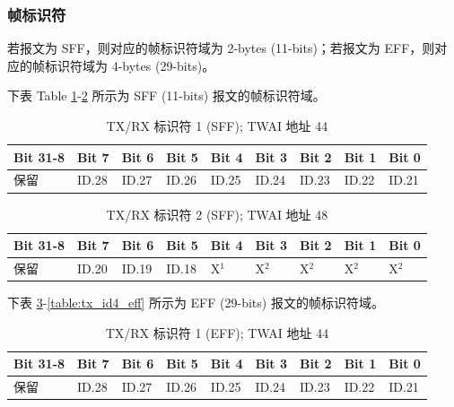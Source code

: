 \documentclass[main\_\_CN.tex]{subfiles}
\begin{document}
\subsubsection{帧标识符}
若报文为 SFF，则对应的帧标识符域为 2-bytes (11-bits)；若报文为 EFF，则对应的帧标识符域为 4-bytes (29-bits)。

下表 Table \ref{table:tx_id1_sff}-\ref{table:tx_id2_sff} 所示为 SFF (11-bits) 报文的帧标识符域。

\begin{longtable}[c]{|p{1.4cm}|p{1.4cm}|p{1.4cm}|p{1.4cm}|p{1.4cm}|p{1.4cm}|p{1.4cm}|p{1.4cm}|p{1.4cm}|}
    \caption{TX/RX 标识符 1 (SFF); TWAI 地址 \hexprefix{}44}
    \label{table:tx_id1_sff}\\
    \hline
       \rowcolor{lightgray}
    Bit 31-8 & Bit 7 & Bit 6 & Bit 5 & Bit 4 & Bit 3 & Bit 2 & Bit 1 & Bit 0\\
    \hline
    保留 & ID.28 & ID.27 & ID.26 & ID.25 & ID.24 & ID.23 & ID.22 & ID.21\\
    \hline
\end{longtable}

\begin{longtable}[c]{|p{1.4cm}|p{1.4cm}|p{1.4cm}|p{1.4cm}|p{1.4cm}|p{1.4cm}|p{1.4cm}|p{1.4cm}|p{1.4cm}|}
    \caption{TX/RX 标识符 2 (SFF); TWAI 地址 \hexprefix{}48}
    \label{table:tx_id2_sff}\\
    \hline
       \rowcolor{lightgray}
    Bit 31-8 & Bit 7 & Bit 6 & Bit 5 & Bit 4 & Bit 3 & Bit 2 & Bit 1 & Bit 0\\
    \hline
    保留 & ID.20 & ID.19 & ID.18 & X$^1$ & X$^2$ & X$^2$ & X$^2$ & X$^2$\\
    \hline
\end{longtable}

下表 \ref{table:tx_id1_eff}-\ref{table:tx_id4_eff} 所示为 EFF (29-bits) 报文的帧标识符域。

\begin{longtable}[c]{|p{1.4cm}|p{1.4cm}|p{1.4cm}|p{1.4cm}|p{1.4cm}|p{1.4cm}|p{1.4cm}|p{1.4cm}|p{1.4cm}|}
    \caption{TX/RX 标识符 1 (EFF); TWAI 地址 \hexprefix{}44}
    \label{table:tx_id1_eff}\\
    \hline
       \rowcolor{lightgray}
    Bit 31-8 & Bit 7 & Bit 6 & Bit 5 & Bit 4 & Bit 3 & Bit 2 & Bit 1 & Bit 0\\
    \hline
    保留 & ID.28 & ID.27 & ID.26 & ID.25 & ID.24 & ID.23 & ID.22 & ID.21\\
    \hline
\end{longtable}
\end{document}
